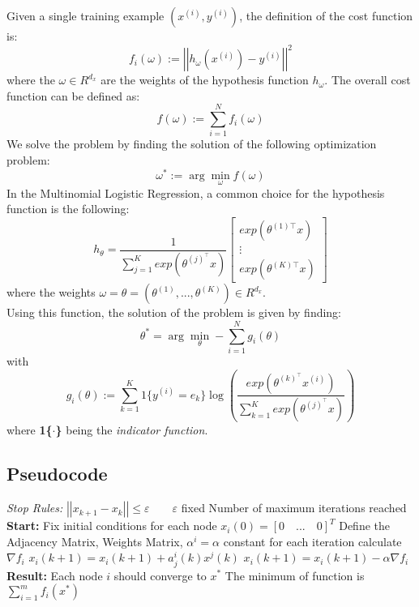 \documentclass[a4paper,11pt,oneside]{book}
\begin{document}
Given a single training example $(x^{(i)}, y^{(i)})$, the definition of the cost function is:
\begin{equation}
f_i\left(\omega\right):=\left|\left|h_\omega\left(x^{(i)}\right)-y^{(i)}\right|\right|^2
\end{equation}
where the $\omega \in R^{d_{x}}$ are the weights of the hypothesis function $h_{\omega}$. The overall cost function can be defined as:
\begin{equation}
f\left(\omega\right):=\sum_{i=1}^{N}{f_i\left(\omega\right)}
\end{equation}
We solve the problem by finding the solution of the following optimization problem:
\begin{equation}
\omega^*:=\arg\min_\omega f\left(\omega\right)
\end{equation}
In the Multinomial Logistic Regression, a common choice for the hypothesis function is the following:
\begin{equation}
h_\theta=\frac{1}{\sum_{j=1}^{K}{exp\left(\theta^{(j)^\top}x\right)}}\begin{bmatrix}exp\left(\theta^{(1)\top}x\right)  \\ \vdots \\ exp\left(\theta^{(K)\top}x\right) \end{bmatrix}
\end{equation}
where the weights $\omega = \theta = (\theta^{(1)}, ..., \theta^{(K)}) \in R^{d_{x}}$. \\
Using this function, the solution of the problem is given by finding:
\begin{equation}
\theta^*=\arg\min_\theta -\sum_{i=1}^{N}{g_i(\theta)}
\end{equation}
with
\begin{equation}
g_i\left(\theta\right):=\sum_{k=1}^{K}{1\{y^{(i)}=e_k\}\log{\left( \frac{exp(\theta^{(k)^\top}x^{(i)})}{\sum_{k=1}^{K}{exp( \theta^{(j)^\top}x )}} \right)}}
\end{equation}
where \textbf{1\{$\cdot$\}} being the \textit{indicator function}.\cite{CITATION:2}

\subsection {Pseudocode} \label{Subsec1.1.3}
\begin{algorithm}
\caption{}
\begin{algorithmic} [1]
\State \textit{Stop Rules:}
\State $\left|\left|x_{k+1} - x_k\right|\right|  \leq \varepsilon \qquad \varepsilon$ fixed
\State Number of maximum iterations reached
\State \textbf{Start:}
\State Fix initial conditions for each node $x_i(0) = [0 \quad ... \quad 0]^T$
\State Define the Adjacency Matrix, Weights Matrix, $\alpha^i = \alpha$ constant for each iteration
	\State calculate $\nabla f_i$
		\State $x_i(k+1) = x_i(k+1) + a^i_j(k) x^j(k)$
	\EndFor
	\State $x_i(k+1) = x_i(k+1) - \alpha \nabla f_i$
\EndWhile
\State \textbf{Result:}
\State Each node $i$ should converge to $x^*$
\State The minimum of function is $\sum \limits_{i=1}^{m}f_i(x^*)$
\end{algorithmic}
\end{algorithm}
\end{document}
